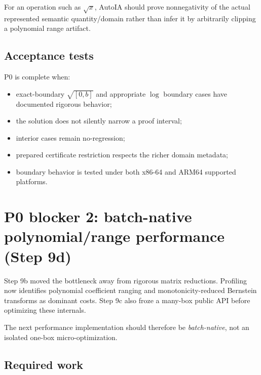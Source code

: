 \documentclass[11pt]{article}
\begin{document}
For an operation such as \(\sqrt{x}\), AutoIA should prove nonnegativity of the
actual represented semantic quantity/domain rather than infer it by arbitrarily
clipping a polynomial range artifact.

\subsection{Acceptance tests}

P0 is complete when:
\begin{itemize}[leftmargin=*]
\item exact-boundary \(\sqrt{[0,b]}\) and appropriate \(\log\) boundary cases
have documented rigorous behavior;
\item the solution does not silently narrow a proof interval;
\item interior cases remain no-regression;
\item prepared certificate restriction respects the richer domain metadata;
\item boundary behavior is tested under both x86-64 and ARM64 supported
platforms.
\end{itemize}

\section{P0 blocker 2: batch-native polynomial/range performance (Step 9d)}

Step 9b moved the bottleneck away from rigorous matrix reductions.  Profiling now
identifies polynomial coefficient ranging and monotonicity-reduced Bernstein
transforms as dominant costs.  Step 9c also froze a many-box public API before
optimizing these internals.

The next performance implementation should therefore be \emph{batch-native}, not
an isolated one-box micro-optimization.

\subsection{Required work}
\end{document}
